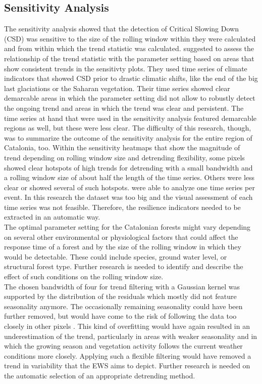 \subsection{Sensitivity Analysis}\label{disc:csd}
The sensitivity analysis showed that the detection of Critical Slowing Down (CSD) was sensitive to the size of the rolling window within they were calculated and from within which the trend statistic was calculated. \cite{dakos2008} suggested to assess the relationship of the trend statistic with the parameter setting based on areas that show consistent trends in the sensitivty plots. They used time series of climate indicators that showed CSD prior to drastic climatic shifts, like the end of the big last glaciations or the Saharan vegetation. Their time series showed clear demarcable areas in which the parameter setting did not allow to robustly detect the ongoing trend and areas in which the trend was clear and persistent. The time series at hand that were used in the sensitivity analysis featured demarcable regions as well, but these were less clear. The difficulty of this research, though, was to summarize the outcome of the sensitivity analysis for the entire region of Catalonia, too. Within the sensitivity heatmaps that show the magnitude of trend depending on rolling window size and detrending flexibility, some pixels showed clear hotspots of high trends for detrending with a small bandwidth and a rolling window size of about half the length of the time series. Others were less clear or showed several of such hotspots. \cite{dakos2008} were able to analyze one time series per event. In this research the dataset was too big and the visual assessment of each time series was not feasible. Therefore, the resilience indicators needed to be extracted in an automatic way.\\
The optimal parameter setting for the Catalonian forests might vary depending on several other environmental or physiological factors that could affect the response time of a forest and by the size of the rolling window in which they would be detectable. These could include species, ground water level, or structural forest type. Further research is needed to identify and describe the effect of such conditions on the rolling window size.\\
The chosen bandwidth of four for trend filtering with a Gaussian kernel was supported by the distribution of the residuals which mostly did not feature seasonality anymore. The occasionally remaining seasonality could have been further removed, but would have come to the risk of following the data too closely in other pixels \citep{dakos2012}. This kind of overfitting would have again resulted in an underestimation of the trend, particularly in areas with weaker seasonality and in which the growing season and vegetation activity follows the current weather conditions more closely. Applying such a flexible filtering would have removed a trend in variability that the EWS aims to depict. Further research is needed on the automatic selection of an appropriate detrending method.\\
